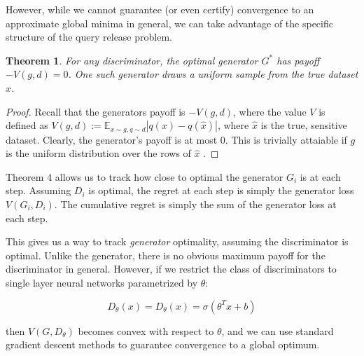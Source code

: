 \documentclass[]{article}
\newtheorem{theorem}{Theorem}
\begin{document}
However, while we cannot guarantee (or even certify) convergence to an approximate global minima in general, we can take advantage of the specific structure of the query release problem. 

\begin{theorem}
    For any discriminator, the optimal generator $G^*$ has payoff $-V(g,d) = 0$. One such generator draws a uniform sample from the true dataset $\hat x$. 
\end{theorem}
\begin{proof}
    Recall that the generators payoff is  $-V(g,d)$, where the value $V$ is defined as $V(g,d) := \mathbb{E}_{x \sim g, q \sim d} |q(x) - q(\hat x)|$, where $\hat x$ is the true, sensitive dataset. Clearly, the generator's payoff is at most $0$. This is trivially attaiable if $g$ is the uniform distribution over the rows of $\hat x$ .
\end{proof}


Theorem 4 allows us to track how close to optimal the generator $G_i$ is at each step. Assuming $D_i$ is optimal, the regret at each step is simply the generator loss $V(G_i, D_i)$. The cumulative regret is simply the sum of the generator loss at each step. 

This gives us a way to track \emph{generator} optimality, assuming the discriminator is optimal. Unlike the generator, there is no obvious maximum payoff for the discriminator in general. However, if we restrict the class of discriminators to single layer neural networks parametrized by $\theta$:

\begin{equation}
    D_\theta(x) = D_\theta(x) = \sigma(\theta^Tx + b)
\end{equation}

then $V(G, D_\theta)$ becomes convex with respect to $\theta$, and we can use standard gradient descent methods to guarantee convergence to a global optimum. 
\end{document}
